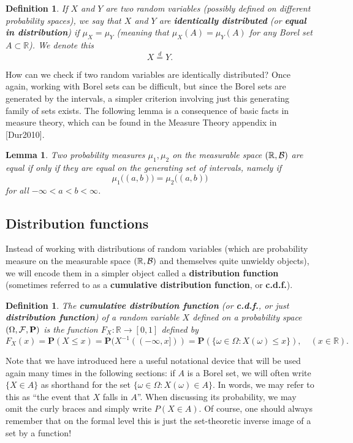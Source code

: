 \documentclass[12pt]{article}
\newtheorem{lemma}[thm]{Lemma}
\newtheorem{defi}[thm]{Definition}
\newcommand{\R}{\mathbb{R}}
\newcommand{\prob}{\mathbf{P}}
\theoremstyle{example}
\begin{document}
\begin{defi}
If $X$ and $Y$ are two random variables (possibly defined on different probability spaces), we say that $X$ and $Y$ are \textbf{identically distributed} (or \textbf{equal in distribution}) if $\mu_X = \mu_Y$ (meaning that $\mu_X(A) = \mu_Y(A)$ for any Borel set $A\subset \R$). We denote this
$$ X \stackrel{d}{=} Y. $$
\end{defi}

How can we check if two random variables are identically distributed? Once again, working with Borel sets can be difficult, but since the Borel sets are generated by the intervals, a simpler criterion involving just this generating family of sets exists. The following lemma is a consequence of basic facts in measure theory, which can be found in the Measure Theory appendix in [Dur2010].

\begin{lemma}
Two probability measures $\mu_1, \mu_2$ on the measurable space $(\R, {\cal B})$ are equal if only if they are equal on the generating set of intervals, namely if
$$ \mu_1\big((a,b)\big) = \mu_2\big((a,b)\big) $$
for all $-\infty < a<b < \infty$.
\end{lemma}

\subsection{Distribution functions}

\label{sec:dist-funs}

Instead of working with distributions of random variables (which are probability measure on the measurable space $(\R, {\cal B})$ and themselves quite unwieldy objects), we will encode them in a simpler object called a \textbf{distribution function} (sometimes referred to as a \textbf{cumulative distribution function}, or \textbf{c.d.f.}).

\begin{defi} The \textbf{cumulative distribution function} (or \textbf{c.d.f.}, or just \textbf{distribution function}) of a random variable $X$ defined on a probability space $(\Omega, {\cal F}, \prob)$ is the function $ F_X:\R \to [0,1]$ defined by
$$ F_X(x) = \prob( X \le x ) = \prob( X^{-1}((-\infty,x])) = \prob( \{ \omega \in \Omega : X(\omega) \le x \} ),
\quad (x\in \R).
$$
\end{defi}

Note that we have introduced here a useful notational device that will be used again many times in the following sections: if $A$ is a Borel set, we will often write $\{X \in A\}$ as shorthand for the set $\{ \omega \in \Omega : X(\omega) \in A \}$. In words, we may refer to this as ``the event that $X$ falls in $A$''. When discussing its probability, we may omit the curly braces and simply write $P(X\in A)$. Of course, one should always remember that on the formal level this is just the set-theoretic inverse image of a set by a function!
\end{document}
